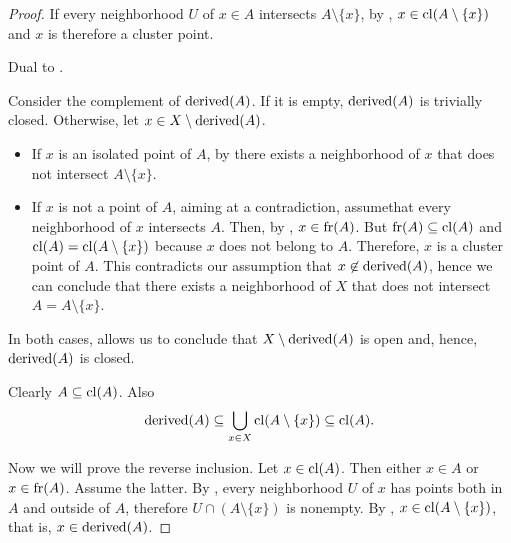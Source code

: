 \begin{proof}
   If every neighborhood \( U \) of \( x \in A \) intersects \( A \setminus \{ x \} \), by , \( x \in \operatorname{cl}(A \setminus \{ x \}) \) and \( x \) is therefore a cluster point.

   Dual to .

   Consider the complement of \( \operatorname{derived}(A) \). If it is empty, \( \operatorname{derived}(A) \) is trivially closed. Otherwise, let \( x \in X \setminus \operatorname{derived}(A) \).

  \begin{itemize}
    \item If \( x \) is an isolated point of \( A \), by  there exists a neighborhood of \( x \) that does not intersect \( A \setminus \{ x \} \).
    \item If \( x \) is not a point of \( A \), aiming at a contradiction, assume\LEM that every neighborhood of \( x \) intersects \( A \). Then, by , \( x \in \operatorname{fr}(A) \). But \( \operatorname{fr}(A) \subseteq \operatorname{cl}(A) \) and \( \operatorname{cl}(A) = \operatorname{cl}(A \setminus \{ x \}) \) because \( x \) does not belong to \( A \). Therefore, \( x \) is a cluster point of \( A \). This contradicts our assumption that \( x \not\in \operatorname{derived}(A) \), hence we can conclude that there exists a neighborhood of \( X \) that does not intersect \( A = A \setminus \{ x \} \).
  \end{itemize}

  In both cases,  allows us to conclude that \( X \setminus \operatorname{derived}(A) \) is open and, hence, \( \operatorname{derived}(A) \) is closed.

   Clearly \( A \subseteq \operatorname{cl}(A) \). Also
  \begin{equation*}
    \operatorname{derived}(A) \subseteq \bigcup_{x \in X} \operatorname{cl}(A \setminus \{ x \}) \subseteq \operatorname{cl}(A).
  \end{equation*}

  Now we will prove the reverse inclusion. Let \( x \in \operatorname{cl}(A) \). Then either \( x \in A \) or \( x \in \operatorname{fr}(A) \). Assume the latter. By , every neighborhood \( U \) of \( x \) has points both in \( A \) and outside of \( A \), therefore \( U \cap (A \setminus \{ x \}) \) is nonempty. By , \( x \in \operatorname{cl}(A \setminus \{ x \}) \), that is, \( x \in \operatorname{derived}(A) \).


\end{proof}
